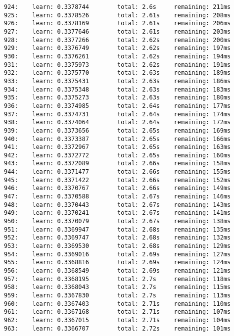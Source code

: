 \documentclass[11pt]{article}
\begin{document}
\begin{Verbatim}[commandchars=\\\{\}]
924:    learn: 0.3378744        total: 2.6s     remaining: 211ms
925:    learn: 0.3378526        total: 2.61s    remaining: 208ms
926:    learn: 0.3378169        total: 2.61s    remaining: 206ms
927:    learn: 0.3377646        total: 2.61s    remaining: 203ms
928:    learn: 0.3377266        total: 2.62s    remaining: 200ms
929:    learn: 0.3376749        total: 2.62s    remaining: 197ms
930:    learn: 0.3376261        total: 2.62s    remaining: 194ms
931:    learn: 0.3375973        total: 2.62s    remaining: 191ms
932:    learn: 0.3375770        total: 2.63s    remaining: 189ms
933:    learn: 0.3375431        total: 2.63s    remaining: 186ms
934:    learn: 0.3375348        total: 2.63s    remaining: 183ms
935:    learn: 0.3375273        total: 2.63s    remaining: 180ms
936:    learn: 0.3374985        total: 2.64s    remaining: 177ms
937:    learn: 0.3374731        total: 2.64s    remaining: 174ms
938:    learn: 0.3374064        total: 2.64s    remaining: 172ms
939:    learn: 0.3373656        total: 2.65s    remaining: 169ms
940:    learn: 0.3373387        total: 2.65s    remaining: 166ms
941:    learn: 0.3372967        total: 2.65s    remaining: 163ms
942:    learn: 0.3372772        total: 2.65s    remaining: 160ms
943:    learn: 0.3372089        total: 2.66s    remaining: 158ms
944:    learn: 0.3371477        total: 2.66s    remaining: 155ms
945:    learn: 0.3371422        total: 2.66s    remaining: 152ms
946:    learn: 0.3370767        total: 2.66s    remaining: 149ms
947:    learn: 0.3370588        total: 2.67s    remaining: 146ms
948:    learn: 0.3370443        total: 2.67s    remaining: 143ms
949:    learn: 0.3370241        total: 2.67s    remaining: 141ms
950:    learn: 0.3370079        total: 2.67s    remaining: 138ms
951:    learn: 0.3369947        total: 2.68s    remaining: 135ms
952:    learn: 0.3369747        total: 2.68s    remaining: 132ms
953:    learn: 0.3369530        total: 2.68s    remaining: 129ms
954:    learn: 0.3369016        total: 2.69s    remaining: 127ms
955:    learn: 0.3368816        total: 2.69s    remaining: 124ms
956:    learn: 0.3368549        total: 2.69s    remaining: 121ms
957:    learn: 0.3368195        total: 2.7s     remaining: 118ms
958:    learn: 0.3368043        total: 2.7s     remaining: 115ms
959:    learn: 0.3367830        total: 2.7s     remaining: 113ms
960:    learn: 0.3367403        total: 2.71s    remaining: 110ms
961:    learn: 0.3367168        total: 2.71s    remaining: 107ms
962:    learn: 0.3367015        total: 2.71s    remaining: 104ms
963:    learn: 0.3366707        total: 2.72s    remaining: 101ms

\end{Verbatim}
\end{document}
